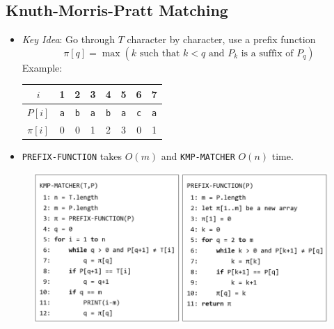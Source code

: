 \documentclass[twocolumn,english]{article}
\providecommand{\tabularnewline}{\\}
\numberwithin{equation}{section}
\numberwithin{figure}{section}
\numberwithin{table}{section}
\providecommand{\tabularnewline}{\\}
\begin{document}
\subsection{Knuth-Morris-Pratt Matching}
\begin{itemize}
\item \emph{Key Idea}: Go through $T$ character by character, use a prefix
function
\[
\pi\left[q\right]=\max\left(k\text{ such that }k<q\text{ and }P_{k}\text{ is a suffix of }P_{q}\right)
\]
Example:
\begin{table}[H]
\centering{}%
\begin{tabular}{cccccccc}
\toprule 
$i$ & 1 & 2 & 3 & 4 & 5 & 6 & 7\tabularnewline
\midrule
$P\left[i\right]$ & \texttt{a} & \texttt{b} & \texttt{a} & \texttt{b} & \texttt{a} & \texttt{c} & \texttt{a}\tabularnewline
$\pi\left[i\right]$ & 0 & 0 & 1 & 2 & 3 & 0 & 1\tabularnewline
\bottomrule
\end{tabular}
\end{table}
\item \texttt{PREFIX-FUNCTION} takes $O\left(m\right)$ and \texttt{KMP-MATCHER}
$O\left(n\right)$ time.
\end{itemize}
\begin{figure}[H]
\centering{}\includegraphics[width=0.8\linewidth]{img/kmp-matching}
\end{figure}
\end{document}
